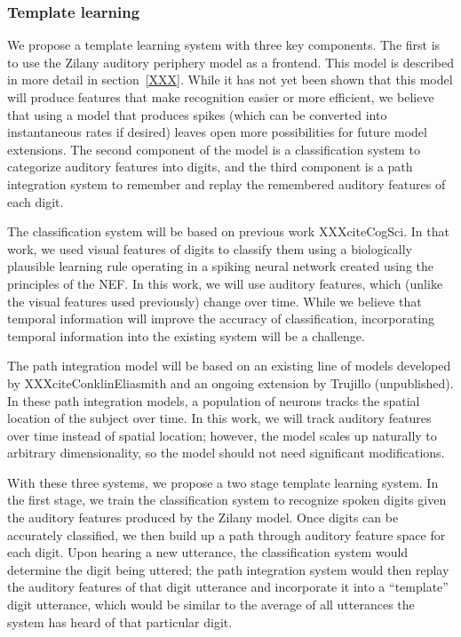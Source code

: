 \documentclass{article}
\begin{document}
\subsubsection{Template learning}

We propose a template learning system
with three key components.
The first is to use the Zilany
auditory periphery model
as a frontend.
This model is described in more detail
in section~\ref{XXX}.
While it has not yet been shown
that this model will produce features
that make recognition easier or more efficient,
we believe that using a model
that produces spikes
(which can be converted into
instantaneous rates if desired)
leaves open more possibilities
for future model extensions.
The second component of the model
is a classification system
to categorize auditory features into digits,
and the third component
is a path integration system
to remember and replay the
remembered auditory features
of each digit.

The classification system will be based
on previous work XXXciteCogSci.
In that work, we used visual features
of digits to classify them
using a biologically plausible learning rule
operating in a spiking neural network
created using the principles of the NEF.
In this work, we will use auditory features,
which (unlike the visual features used previously)
change over time.
While we believe that temporal information
will improve the accuracy of classification,
incorporating temporal information
into the existing system will be a challenge.

The path integration model will be based
on an existing line of models
developed by XXXciteConklinEliasmith
and an ongoing extension
by Trujillo (unpublished).
In these path integration models,
a population of neurons tracks
the spatial location of the subject
over time.
In this work, we will track
auditory features over time
instead of spatial location;
however, the model scales up naturally
to arbitrary dimensionality,
so the model should not need
significant modifications.

With these three systems,
we propose a
two stage template learning system.
In the first stage,
we train the classification system
to recognize spoken digits
given the auditory features
produced by the Zilany model.
Once digits can be accurately classified,
we then build up a path through
auditory feature space for each digit.
Upon hearing a new utterance,
the classification system
would determine the digit being uttered;
the path integration system
would then replay the auditory features
of that digit utterance
and incorporate it into
a ``template'' digit utterance,
which would be similar to the
average of all utterances
the system has heard
of that particular digit.
\end{document}
